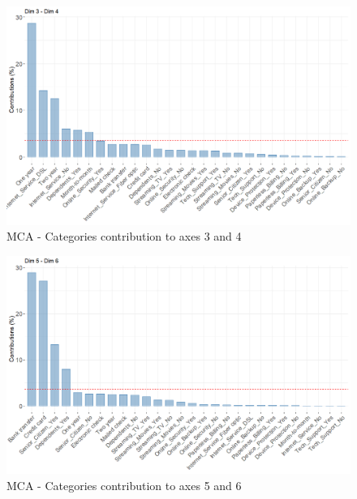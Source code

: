 \documentclass[
]{book}
\begin{document}
\begin{figure}

{\centering \includegraphics[width=15.28in]{./imgs/mca_contrib_34} 

}

\caption{MCA -  Categories contribution to axes 3 and 4}\label{fig:mcacontrib34}
\end{figure}

\begin{figure}

{\centering \includegraphics[width=15.28in]{./imgs/mca_contrib_56} 

}

\caption{MCA -  Categories contribution to axes 5 and 6}\label{fig:mcacontrib56}
\end{figure}
\end{document}
